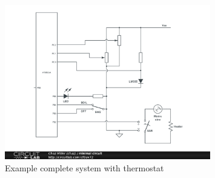\documentclass[dvips,12pt]{article}
\begin{document}
\begin{figure}[h]
    \begin{centering}
    \includegraphics[width=0.8\textwidth]{max}
    \caption{Example complete system with thermostat} 
    \label{fig:max}
    \end{centering}
\end{figure}
\end{document}
